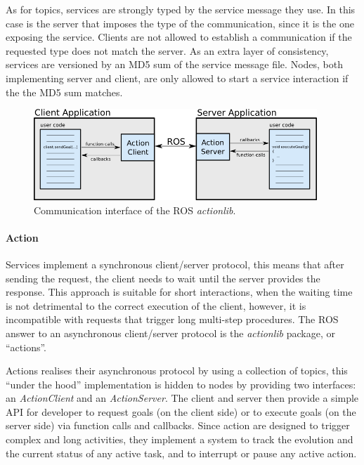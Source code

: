 As for topics, services are strongly typed by the service message they use. In this case is the server that imposes the type of the communication, since it is the one exposing the service. Clients are not allowed to establish a communication if the requested type does not match the server. As an extra layer of consistency, services are versioned by an MD5 sum of the service message file. Nodes, both implementing server and client, are only allowed to start a service interaction if the the MD5 sum matches.

\begin{figure}[t]
    \centering
    \includegraphics[width=0.95\textwidth]{gfx/ros/action}
    \caption{Communication interface of the ROS \textit{actionlib}.}\label{fig:ros-action}
\end{figure}

\paragraph{Action} Services implement a synchronous client/server protocol, this means that after sending the request, the client needs to wait until the server provides the response. This approach is suitable for short interactions, when the waiting time is not detrimental to the correct execution of the client, however, it is incompatible with requests that trigger long multi-step procedures. The ROS answer to an asynchronous client/server protocol is the \textit{actionlib} package, or ``actions''.

Actions realises their asynchronous protocol by using a collection of topics, this ``under the hood'' implementation is hidden to nodes by providing two interfaces: an \textit{ActionClient} and an \textit{ActionServer}. The client and server then provide a simple API for developer to request goals (on the client side) or to execute goals (on the server side) via function calls and callbacks. Since action are designed to trigger complex and long activities, they implement a system to track the evolution and the current status of any active task, and to interrupt or pause any active action.

